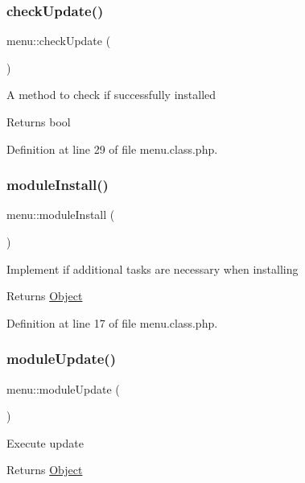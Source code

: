 \subsubsection{\texorpdfstring{check\+Update()}{checkUpdate()}}
{\footnotesize\ttfamily menu\+::check\+Update (\begin{DoxyParamCaption}{ }\end{DoxyParamCaption})}

A method to check if successfully installed \begin{DoxyReturn}{Returns}
bool 
\end{DoxyReturn}


Definition at line 29 of file menu.\+class.\+php.

\mbox{\label{classmenu_ae8c300e3fc86ad4a834e489d849c69e1}} 
\subsubsection{\texorpdfstring{module\+Install()}{moduleInstall()}}
{\footnotesize\ttfamily menu\+::module\+Install (\begin{DoxyParamCaption}{ }\end{DoxyParamCaption})}

Implement if additional tasks are necessary when installing \begin{DoxyReturn}{Returns}
\hyperlink{classObject}{Object} 
\end{DoxyReturn}


Definition at line 17 of file menu.\+class.\+php.

\mbox{\label{classmenu_aa9eb9adadde15b730b887564b9184023}} 
\subsubsection{\texorpdfstring{module\+Update()}{moduleUpdate()}}
{\footnotesize\ttfamily menu\+::module\+Update (\begin{DoxyParamCaption}{ }\end{DoxyParamCaption})}

Execute update \begin{DoxyReturn}{Returns}
\hyperlink{classObject}{Object} 
\end{DoxyReturn}


